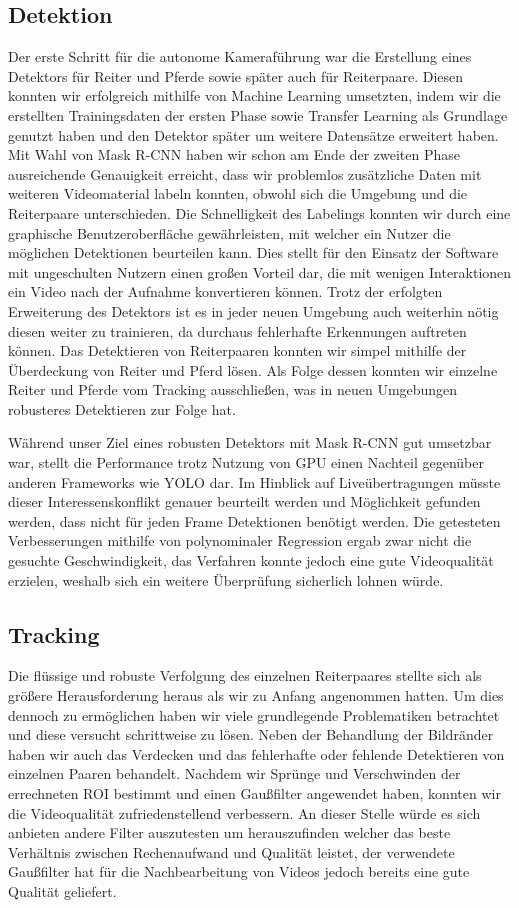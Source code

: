 \subsection*{Detektion}
Der erste Schritt für die autonome Kameraführung war die Erstellung eines Detektors für Reiter und Pferde sowie später auch für Reiterpaare. Diesen konnten wir erfolgreich mithilfe von Machine Learning umsetzten, indem wir die erstellten Trainingsdaten der ersten Phase sowie Transfer Learning als Grundlage genutzt haben und den Detektor später um weitere Datensätze erweitert haben. Mit Wahl von Mask R-CNN haben wir schon am Ende der zweiten Phase ausreichende Genauigkeit erreicht, dass wir problemlos zusätzliche Daten mit weiteren Videomaterial labeln konnten, obwohl sich die Umgebung und die Reiterpaare unterschieden. Die Schnelligkeit des Labelings konnten wir durch eine graphische Benutzeroberfläche gewährleisten, mit welcher ein Nutzer die möglichen Detektionen  beurteilen kann. Dies stellt für den Einsatz der Software mit ungeschulten Nutzern einen großen Vorteil dar, die mit wenigen Interaktionen ein Video nach der Aufnahme konvertieren können. Trotz der erfolgten Erweiterung des Detektors ist es in jeder neuen Umgebung auch weiterhin nötig diesen weiter zu trainieren, da durchaus fehlerhafte Erkennungen auftreten können.
Das Detektieren von Reiterpaaren konnten wir simpel mithilfe der Überdeckung von Reiter und Pferd lösen. Als Folge dessen konnten wir einzelne Reiter und Pferde vom Tracking ausschließen, was in neuen Umgebungen robusteres Detektieren zur Folge hat.

Während unser Ziel eines robusten Detektors mit Mask R-CNN gut umsetzbar war, stellt die Performance trotz Nutzung von GPU einen Nachteil gegenüber anderen Frameworks wie YOLO dar. Im Hinblick auf Liveübertragungen müsste dieser Interessenskonflikt genauer beurteilt werden und Möglichkeit gefunden werden, dass nicht für jeden Frame Detektionen benötigt werden. Die getesteten Verbesserungen mithilfe von polynominaler Regression ergab zwar nicht die gesuchte Geschwindigkeit, das Verfahren konnte jedoch eine gute Videoqualität erzielen, weshalb sich ein weitere Überprüfung sicherlich lohnen würde.


\subsection*{Tracking}
Die flüssige und robuste Verfolgung des einzelnen Reiterpaares stellte sich als größere Herausforderung heraus als wir zu Anfang angenommen hatten. Um dies dennoch zu ermöglichen haben wir viele grundlegende Problematiken betrachtet und diese versucht schrittweise zu lösen. 
Neben der Behandlung der Bildränder haben wir auch das Verdecken und das fehlerhafte oder fehlende Detektieren von einzelnen Paaren behandelt. Nachdem wir Sprünge und Verschwinden der errechneten ROI bestimmt und einen Gaußfilter angewendet haben, konnten wir die Videoqualität zufriedenstellend verbessern. An dieser Stelle würde es sich anbieten andere Filter auszutesten um herauszufinden welcher das beste Verhältnis zwischen Rechenaufwand und Qualität leistet, der verwendete Gaußfilter hat für die Nachbearbeitung von Videos jedoch bereits eine gute Qualität geliefert.

